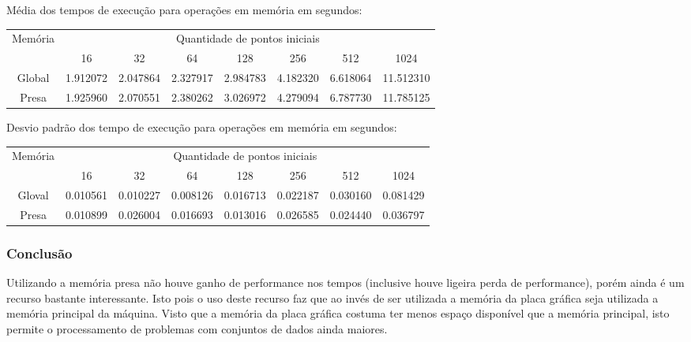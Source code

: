   \hspace{1mm}\newline
  
  \noindent Média dos tempos de execução para operações em memória em segundos:\\
  \begin{scriptsize}
  \begin{tabular}{| c | c | c | c | c | c | c | c |}
    \hline
    \multirow{2}{*}{Memória}& \multicolumn{7}{|c|}{Quantidade de pontos iniciais} \\ \cline{2-8}
    & 16 & 32 & 64 & 128 & 256 & 512 & 1024 \\ \hline
    Global & 1.912072 & 2.047864 & 2.327917 & 2.984783 & 4.182320 & 6.618064 & 11.512310 \\ \hline
    Presa & 1.925960 & 2.070551 & 2.380262 & 3.026972 & 4.279094 & 6.787730 & 11.785125\\ \hline
  \end{tabular}
  \end{scriptsize}
  
  \hspace{1mm}\newline
  
  \noindent Desvio padrão dos tempo de execução para operações em memória em segundos:\\
  \begin{scriptsize}
  \begin{tabular}{| c | c | c | c | c | c | c | c |}
    \hline
    \multirow{2}{*}{Memória}& \multicolumn{7}{|c|}{Quantidade de pontos iniciais} \\ \cline{2-8}
    & 16 & 32 & 64 & 128 & 256 & 512 & 1024\\ \hline
    Gloval & 0.010561 & 0.010227 & 0.008126 & 0.016713 & 0.022187 & 0.030160 & 0.081429\\ \hline
    Presa & 0.010899 & 0.026004 & 0.016693 & 0.013016 & 0.026585 & 0.024440 & 0.036797\\ \hline
  \end{tabular}
  \end{scriptsize}
  
    \subsubsection{Conclusão}
    Utilizando a memória presa não houve ganho de performance nos tempos (inclusive houve ligeira perda de performance), porém ainda é um recurso bastante interessante. Isto pois o uso deste recurso faz que ao invés de ser utilizada a memória da placa gráfica seja utilizada a memória principal da máquina. Visto que a memória da placa gráfica costuma ter menos espaço disponível que a memória principal, isto permite o processamento de problemas com conjuntos de dados ainda maiores.
  
